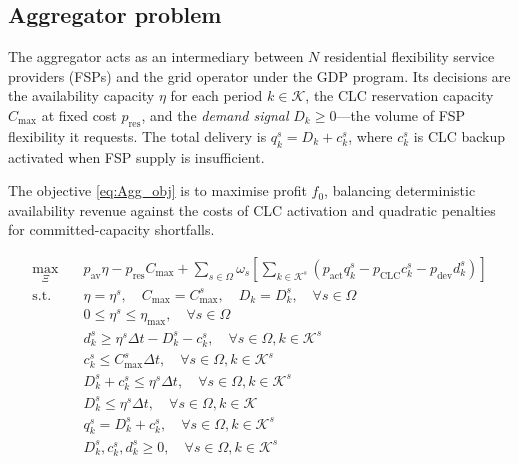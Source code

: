 

\subsection{Aggregator problem}
\label{sec:aggregator}
The aggregator acts as an intermediary between $N$ residential flexibility service providers (FSPs) and the grid operator under the GDP program. Its decisions are the availability capacity $\eta$ for each period $k \in \mathcal{K}$, the CLC reservation capacity $C_{\max}$ at fixed cost $p_{\text{res}}$, and the \emph{demand signal} $D_k \geq 0$—the volume of FSP flexibility it requests. The total delivery is $q_k^s = D_k + c_k^s$, where $c_k^s$ is CLC backup activated when FSP supply is insufficient.

The objective \eqref{eq:Agg_obj} is to maximise profit $f_0$, balancing deterministic availability revenue against the costs of CLC activation and quadratic penalties for committed-capacity shortfalls.

\begin{subequations}
\label{eq:Agg-IEEE-Stochastic}
\begin{align}
\max_{\Xi} \quad &  p_{\text{av}} \eta - p_{\text{res}} C_{\max} +\sum_{s \in \Omega} \omega_s \left[ \sum_{k \in \mathcal{K}^s} (p_{\text{act}} q^s_k - p_{\text{CLC}} c^s_k - p_{\text{dev}} d^s_k) \right] \label{eq:obj_stoch} \\
\text{s.t.} \quad & \eta = \eta^{s}, \quad C_{\max} = C_{\max}^{s}, \quad D_k = D_k^s, \quad \forall s \in \Omega \label{eq:non_anticipativity} \\
& 0 \leq \eta^s \leq \eta_{\max}, \quad \forall s \in \Omega \label{eq:c1_stoch} \\
& d^s_k \geq \eta^s \Delta t - D_k^s - c^s_k, \quad \forall s \in \Omega, k \in \mathcal{K}^s \label{eq:c3_stoch} \\
& c^s_k \leq C_{\max}^s \Delta t, \quad \forall s \in \Omega, k \in \mathcal{K}^s \label{eq:c4_stoch} \\
& D_k^s + c^s_k \leq \eta^s \Delta t, \quad \forall s \in \Omega, k \in \mathcal{K}^s \label{eq:c5_stoch} \\
& D_k^s \leq \eta^s \Delta t, \quad \forall s \in \Omega, k \in \mathcal{K} \label{eq:c_dk_cap} \\
& q^s_k = D_k^s + c^s_k, \quad \forall s \in \Omega, k \in \mathcal{K}^s \label{eq:c_q_def} \\
& D_k^s, c^s_k, d^s_k \geq 0, \quad \forall s \in \Omega, k \in \mathcal{K}^s \label{eq:c6_stoch}
\end{align}
\end{subequations}

